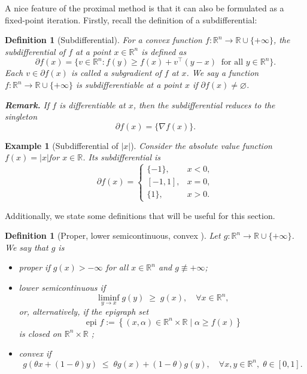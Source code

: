 \documentclass[11pt, twoside]{report}
\newtheorem{definition}[theorem]{Definition}
\newtheorem{example}[theorem]{Example}
\begin{document}
A nice feature of the proximal method is that it can also be formulated as a fixed-point iteration. Firstly, recall the definition of a subdifferential:
\begin{definition}[Subdifferential]
For a convex function $f : \mathbb{R}^n \to \mathbb{R} \cup \{+\infty\}$, the \emph{subdifferential} of $f$ at a point $x \in \mathbb{R}^n$ is defined as
\[
\partial f(x) = \bigl\{ v \in \mathbb{R}^n : f(y) \geq f(x) + v^\top (y - x) \;\; \text{for all } y \in \mathbb{R}^n \bigr\}.
\]
Each $v \in \partial f(x)$ is called a subgradient of $f$ at $x$. We say a function $f : \mathbb{R}^n \to \mathbb{R} \cup \{+\infty\}$ is subdifferentiable at a point $x$ if $\partial f(x) \neq \varnothing$.
\medskip

\noindent
\textbf{Remark.} If $f$ is differentiable at $x$, then the subdifferential reduces to the singleton
\[
\partial f(x) = \{ \nabla f(x) \}.
\]
\end{definition}
\begin{example}[Subdifferential of $|x|$]
Consider the absolute value function $f(x) = |x| $for $x \in \mathbb{R} $. Its subdifferential is
\[
\partial f(x) =
\begin{cases}
\{-1\}, & x < 0, \\[6pt]
[-1,1], & x = 0, \\[6pt]
\{1\}, & x > 0.
\end{cases}
\]
\end{example}
Additionally, we state some definitions that will be useful for this section.
\begin{definition}[Proper, lower semicontinuous, convex \cite{rockafellar1998variational}]
Let \(g : \mathbb{R}^n \to \mathbb{R} \cup \{+\infty\}\).  
We say that \(g\) is
\begin{itemize}
    \item \emph{proper} if \(g(x) > -\infty\) for all \(x \in \mathbb{R}^n\) and \(g \not\equiv +\infty\);
    \item \emph{lower semicontinuous} if
    \[
        \liminf_{y \to x} g(y) \;\geq\; g(x), \quad \forall x \in \mathbb{R}^n,
    \]
    or, alternatively, if the epigraph set
    $$
        \text { epi } f:=\left\{(x, \alpha) \in \mathbb{R}^n \times \mathbb{R} \mid \alpha \geq f(x)\right\}
    $$
    is closed on $\mathbb{R}^n \times \mathbb{R}$ \cite[Theorem 1.6]{rockafellar1998variational};
    \item \emph{convex} if
    \[
        g(\theta x + (1-\theta) y) \;\leq\; \theta g(x) + (1-\theta) g(y),
        \quad \forall x,y \in \mathbb{R}^n,\; \theta \in [0,1].
    \]
\end{itemize}
\end{definition}
\end{document}
